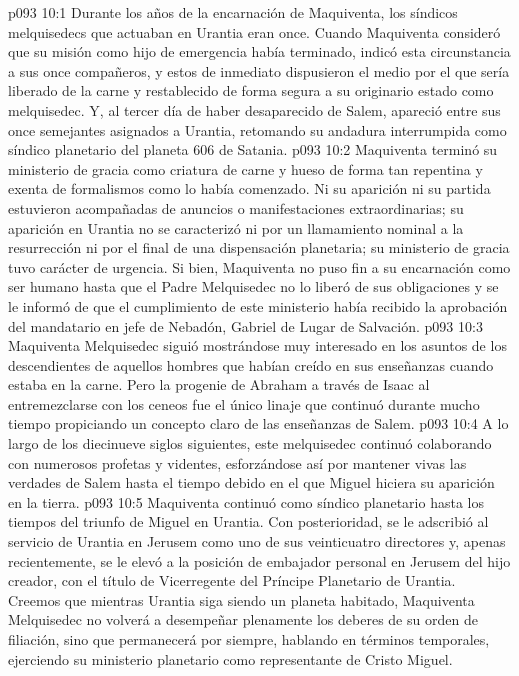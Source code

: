 \vs p093 10:1 Durante los años de la encarnación de Maquiventa, los síndicos melquisedecs que actuaban en Urantia eran once. Cuando Maquiventa consideró que su misión como hijo de emergencia había terminado, indicó esta circunstancia a sus once compañeros, y estos de inmediato dispusieron el medio por el que sería liberado de la carne y restablecido de forma segura a su originario estado como melquisedec. Y, al tercer día de haber desaparecido de Salem, apareció entre sus once semejantes asignados a Urantia, retomando su andadura interrumpida como síndico planetario del planeta 606 de Satania.
\vs p093 10:2 Maquiventa terminó su ministerio de gracia como criatura de carne y hueso de forma tan repentina y exenta de formalismos como lo había comenzado. Ni su aparición ni su partida estuvieron acompañadas de anuncios o manifestaciones extraordinarias; su aparición en Urantia no se caracterizó ni por un llamamiento nominal a la resurrección ni por el final de una dispensación planetaria; su ministerio de gracia tuvo carácter de urgencia. Si bien, Maquiventa no puso fin a su encarnación como ser humano hasta que el Padre Melquisedec no lo liberó de sus obligaciones y se le informó de que el cumplimiento de este ministerio había recibido la aprobación del mandatario en jefe de Nebadón, Gabriel de Lugar de Salvación.
\vs p093 10:3 \pc Maquiventa Melquisedec siguió mostrándose muy interesado en los asuntos de los descendientes de aquellos hombres que habían creído en sus enseñanzas cuando estaba en la carne. Pero la progenie de Abraham a través de Isaac al entremezclarse con los ceneos fue el único linaje que continuó durante mucho tiempo propiciando un concepto claro de las enseñanzas de Salem.
\vs p093 10:4 A lo largo de los diecinueve siglos siguientes, este melquisedec continuó colaborando con numerosos profetas y videntes, esforzándose así por mantener vivas las verdades de Salem hasta el tiempo debido en el que Miguel hiciera su aparición en la tierra.
\vs p093 10:5 Maquiventa continuó como síndico planetario hasta los tiempos del triunfo de Miguel en Urantia. Con posterioridad, se le adscribió al servicio de Urantia en Jerusem como uno de sus veinticuatro directores y, apenas recientemente, se le elevó a la posición de embajador personal en Jerusem del hijo creador, con el título de Vicerregente del Príncipe Planetario de Urantia. Creemos que mientras Urantia siga siendo un planeta habitado, Maquiventa Melquisedec no volverá a desempeñar plenamente los deberes de su orden de filiación, sino que permanecerá por siempre, hablando en términos temporales, ejerciendo su ministerio planetario como representante de Cristo Miguel.
